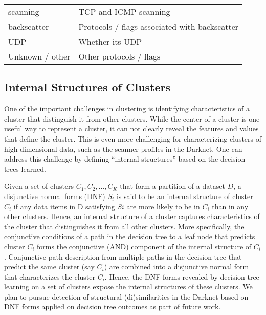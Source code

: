 \documentclass[manuscript, nonacm]{acmart}
\begin{document}
\begin{table}[t]
\begin{tabular}{l|l}
scanning             & TCP and ICMP scanning                                                       \\ 
backscatter          & Protocols / flags associated with backscatter                                \\ 
UDP                  & Whether its UDP                                                              \\ 
Unknown / other      & Other protocols / flags                                                      \\\hline 
\end{tabular}
\end{table}

\subsection{Internal Structures of Clusters}

One of the important challenges in clustering is identifying characteristics 
of a cluster that distinguish it from other clusters.  While the center of a cluster 
is one useful way to represent a cluster, it can not clearly reveal the features and 
values that define the cluster.  This is even more challenging for characterizing clusters 
of high-dimensional data, such as the scanner profiles in the Darknet.
One can address this challenge by defining “internal structures”  
based on the decision trees learned.  

Given a set of clusters ${C_1, C_2, \ldots, C_K}$ that form
a partition of a dataset $D$, a disjunctive normal forms (DNF) $S_i$ is said 
to be an internal structure of cluster $C_i$ if any data items in D satisfying 
$Si$ are more likely to be in $C_i$ than in any other clusters.  
Hence, an internal structure of a cluster captures characteristics of the cluster that distinguishes it from all other clusters.  %
More specifically, the conjunctive conditions of a path in the decision tree to a leaf node that predicts cluster $C_i$ forms the conjunctive (AND) component of the internal
structure of $C_i$.  Conjunctive path description from multiple paths in the decision tree that predict the 
same cluster (say $C_i$) are combined into a disjunctive normal form that characterizes the cluster 
$C_i$.  
Hence, the DNF forms revealed by decision tree learning 
on a set of clusters expose the internal structures of these clusters. 
We plan to pursue detection of structural (di)similarities in the Darknet based on DNF forms applied
on decision tree outcomes as part of future work.
\end{document}
